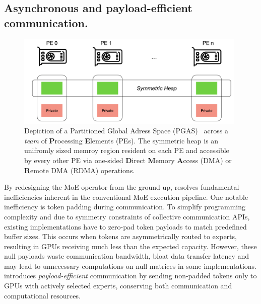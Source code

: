\subsection{Asynchronous and payload-efficient communication.}\label{subsec:asynchronous-and-payload-efficient-communication.}
\begin{figure}[!ht]
    \centering
    \includegraphics[width=0.98\textwidth, keepaspectratio]{figures/pgas}
    \caption{Depiction of a Partitioned Global Adress Space (PGAS)~\cite{10.1145/1278177.1278183}
        across a \textit{team} of \textbf{P}rocessing \textbf{E}lements (PEs). The symmetric heap is an
    unifromly sized memroy region resident on each PE and accessible by every other PE via one-sided
    \textbf{D}irect \textbf{M}emory \textbf{A}ccess (DMA) or \textbf{R}emote DMA (RDMA) operations.}
    \label{fig:pgas}
\end{figure}
By redesigning the MoE operator from the ground up,
\sysname resolves fundamental inefficiencies inherent in the conventional MoE execution pipeline.
One notable inefficiency is token padding during communication.
To simplify programming complexity and due to symmetry constraints of collective communication APIs,
existing implementations have to zero-pad token payloads to match predefined buffer sizes.
This occurs when tokens are asymmetrically routed to experts, resulting in GPUs receiving much less than the expected
capacity.
However, these null payloads waste communication bandwidth, bloat data transfer latency and may lead to
unnecessary computations on null matrices in some implementations.
\sysname introduces \emph{payload-efficient} communication by sending non-padded tokens only to
GPUs with actively selected experts, conserving both communication and computational resources.
